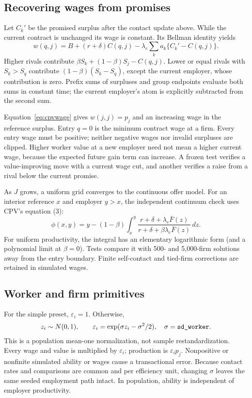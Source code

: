 \documentclass[11pt,letterpaper]{article}
\newcommand{\code}[1]{\texttt{\detokenize{#1}}}
\begin{document}
\subsection{Recovering wages from promises}
Let $C_k'$ be the promised surplus after the contact update above. While
the current contract is unchanged its wage is constant. Its Bellman
identity yields
\begin{equation}\label{eq:cpvwage}
 w(q,j)=B+(r+\delta)C(q,j)
       -\lambda_e\sum_k a_k\{C_k'-C(q,j)\}.
\end{equation}
Higher rivals contribute
$\beta S_k+(1-\beta)S_j-C(q,j)$.
Lower or equal rivals with $S_k>S_q$ contribute
$(1-\beta)(S_k-S_q)$, except the current employer, whose contribution
is zero. Prefix sums of surpluses and group endpoints evaluate both
sums in constant time; the current employer's atom is explicitly
subtracted from the second sum.

Equation~\eqref{eq:cpvwage} gives $w(j,j)=p_j$ and an increasing wage
in the reference surplus. Entry $q=0$ is the minimum contract wage at a
firm. Every entry wage must be positive; neither negative wages nor
invalid surpluses are clipped. Higher worker value at a new employer
need not mean a higher current wage, because the expected future gain
term can increase. A frozen test verifies a value-improving move with a
current wage cut, and another verifies a raise from a rival below the
current promise.

As $J$ grows, a uniform grid converges to the continuous offer model.
For an interior reference $x$ and employer $y>x$, the independent
continuum check uses CPV's equation (3):
\begin{equation}
 \phi(x,y)=y-(1-\beta)\int_x^y
 \frac{r+\delta+\lambda_e\bar F(z)}
 {r+\delta+\beta\lambda_e\bar F(z)}\,dz.
\end{equation}
For uniform productivity, the integral has an elementary logarithmic
form (and a polynomial limit at $\beta=0$). Tests compare it with
500- and 5,000-firm solutions away from the entry boundary. Finite
self-contact and tied-firm corrections are retained in simulated wages.

\subsection{Worker and firm primitives}
For the simple preset, $\varepsilon_i=1$. Otherwise,
\begin{equation}
 z_i\sim N(0,1),\qquad
 \varepsilon_i=\exp(\sigma z_i-\sigma^2/2),\quad
 \sigma=\text{\code{sd_worker}}.
\end{equation}
This is a population mean-one normalization, not sample
restandardization. Every wage and value is multiplied by
$\varepsilon_i$; production is $\varepsilon_i p_j$. Nonpositive or
nonfinite simulated ability or wages cause a transactional error.
Because contact rates and comparisons are common and per efficiency
unit, changing $\sigma$ leaves the same seeded employment path intact.
In population, ability is independent of employer productivity.
\end{document}
